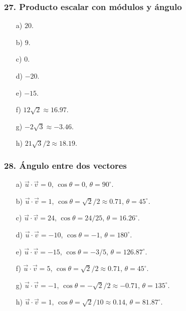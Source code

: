 \subsubsection*{27. Producto escalar con módulos y ángulo}
\begin{enumerate}
    \item[a)] $20$.
    \item[b)] $9$.
    \item[c)] $0$.
    \item[d)] $-20$.
    \item[e)] $-15$.
    \item[f)] $12\sqrt{2}\approx16.97$.
    \item[g)] $-2\sqrt{3}\approx-3.46$.
    \item[h)] $21\sqrt{3}/2\approx18.19$.
\end{enumerate}

\subsubsection*{28. Ángulo entre dos vectores}
\begin{enumerate}
    \item[a)] $\vec{u}\cdot\vec{v}=0$,
    $\cos\theta=0$, $\theta=90^\circ$.
    \item[b)] $\vec{u}\cdot\vec{v}=1$,
    $\cos\theta=\sqrt{2}/2\approx0.71$, $\theta=45^\circ$.
    \item[c)] $\vec{u}\cdot\vec{v}=24$,
    $\cos\theta=24/25$, $\theta=16.26^\circ$.
    \item[d)] $\vec{u}\cdot\vec{v}=-10$,
    $\cos\theta=-1$, $\theta=180^\circ$.
    \item[e)] $\vec{u}\cdot\vec{v}=-15$,
    $\cos\theta=-3/5$, $\theta=126.87^\circ$.
    \item[f)] $\vec{u}\cdot\vec{v}=5$,
    $\cos\theta=\sqrt{2}/2\approx0.71$, $\theta=45^\circ$.
    \item[g)] $\vec{u}\cdot\vec{v}=-1$,
    $\cos\theta=-\sqrt{2}/2\approx-0.71$, $\theta=135^\circ$.
    \item[h)] $\vec{u}\cdot\vec{v}=1$,
    $\cos\theta=\sqrt{2}/10\approx0.14$, $\theta=81.87^\circ$.
\end{enumerate}

